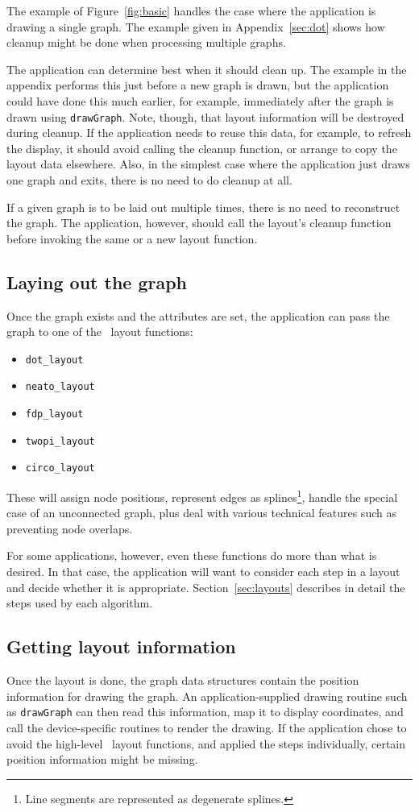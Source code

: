 The example of Figure~\ref{fig:basic}
handles the case where the application is drawing a single graph.
The example given in Appendix~\ref{sec:dot}
shows how cleanup might be done when processing multiple graphs.

The application can determine best when it should clean up. The example
in the appendix
performs this just before a new graph is drawn, but the application could
have done this much earlier, for example, immediately after the graph
is drawn using {\tt drawGraph}. Note, though, that layout information
will be destroyed during cleanup. If the application needs to reuse this
data, for example, to refresh the display, it should avoid calling the
cleanup function, or arrange to copy the layout data elsewhere.
Also, in the simplest case where the application just draws one graph
and exits, there is no need to do cleanup at all.

If a given graph is to be laid out multiple times, there is no need to
reconstruct the graph. The application, however, should call the layout's
cleanup function before invoking the same or a new layout function.

\subsection{Laying out the graph}

Once the graph exists and the attributes are set, the application can
pass the graph to one of the \gviz\ layout functions:
\begin{itemize}
\item \verb+dot_layout+
\item \verb+neato_layout+
\item \verb+fdp_layout+
\item \verb+twopi_layout+
\item \verb+circo_layout+
\end{itemize}
These will assign node positions,
represent edges as splines\footnote{
Line segments are represented as degenerate splines.
}, handle the special case of an unconnected
graph, plus deal with various technical features such as preventing
node overlaps.

For some applications, however, even these functions do more than
what is desired. In that case, the application will want to consider
each step in a layout and decide whether it is appropriate.
Section~\ref{sec:layouts} describes in detail the steps used by each 
algorithm.

\subsection{Getting layout information}
Once the layout is done, the graph data structures contain
the position information for drawing the graph. 
An application-supplied
drawing routine such as {\tt drawGraph} can then read this information,
map it to display coordinates, and call the device-specific routines to
render the drawing.
If the
application chose to avoid the high-level \gviz\ layout functions, 
and applied the
steps individually, certain position information might be missing.

